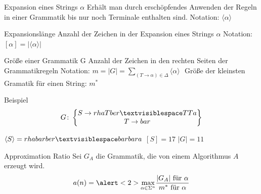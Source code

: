 \documentclass[xcolor=dvipsnames]{beamer}
\begin{document}
\begin{frame}{\secname}
\begin{block}{Expansion  eines Strings $\alpha$}
	\Gap
	Erhält man durch erschöpfendes Anwenden der Regeln in einer Grammatik bis nur noch Terminale enthalten sind. \linebreak
	Notation: $\langle \alpha \rangle$
\end{block}
\end{frame}

\begin{frame}{\secname}
\begin{block}{Expansionslänge}
	\Gap
	Anzahl der Zeichen in der Expansion eines Strings $\alpha$ \linebreak
	Notation: $[\alpha]  = \lvert \langle \alpha \rangle \lvert$
\end{block}
\end{frame}

\begin{frame}{\secname}
\begin{block}{Größe einer Grammatik G}
	\Gap
	Anzahl der Zeichen in den rechten Seiten der Grammatikregeln\linebreak
	Notation: $m = \lvert G \lvert = \sum\limits_{(T \rightarrow \alpha) \in \Delta} \langle \alpha \rangle$ \linebreak $ $\linebreak
	Größe der kleinsten Gramatik für einen String: $m^*$
\end{block}
\end{frame}

\begin{frame}{\secname}
\begin{block}{Beispiel}
	$$
	G \colon \begin{Bmatrix} 
		S \rightarrow rhaTber \textvisiblespace TTa \\
		T \rightarrow bar
	\end{Bmatrix}
	$$
	
	$\langle S \rangle = rhabarber \textvisiblespace barbara$ \linebreak
	$[S] = 17$ \linebreak
	$\lvert G \lvert = 11$
\end{block}
\end{frame}

\begin{frame}{\secname}
\begin{block}{Approximation Ratio}
	\Gap
	Sei $G_A$ die Grammatik, die von einem Algorithmus $A$ erzeugt wird.
	$$
	a(n) = \alert<2>{\max\limits_{\alpha \in \Sigma^n}}\frac{
		\textrm{$\lvert G_A \lvert$ für $\alpha$}
	}{
		\textrm{$m^*$ für $\alpha$}
	}
	$$
	
\end{block}
\end{frame}
\end{document}
